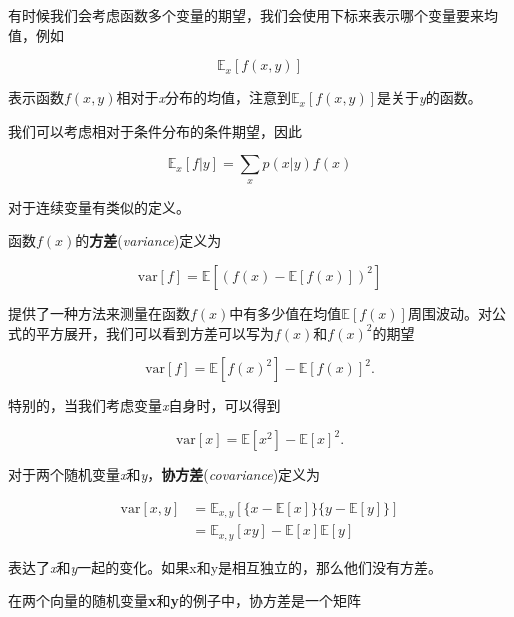 	有时候我们会考虑函数多个变量的期望，我们会使用下标来表示哪个变量要来均值，例如
	
	\begin{equation}
	\mathbb{E}_x[f(x,y)]
	\end{equation}
	
	表示函数$f(x, y)$相对于\textit{x}分布的均值，注意到$\mathbb{E}_x [f(x, y)]$是关于\textit{y}的函数。
	
	我们可以考虑相对于条件分布的条件期望，因此
	
	\begin{equation}
	\mathbb{E}_x [f|y] = \sum_x p(x|y)f(x)
	\end{equation}
	
	对于连续变量有类似的定义。
	
	函数$f(x)$的\textbf{方差}(\textit{variance})定义为
	
	\begin{equation}
	\mathrm{var}[f] = \mathbb{E} [(f(x) - \mathbb{E}[f(x)])^2]
	\end{equation}
	
	提供了一种方法来测量在函数$f(x)$中有多少值在均值$\mathbb{E}[f(x)]$周围波动。对公式的平方展开，我们可以看到方差可以写为$f(x)$和$f(x)^2$的期望
	
	\begin{equation}
	\mathrm{var}[f] = \mathbb{E} [f(x)^2] - \mathbb{E}[f(x)]^2.
	\end{equation}
	
	特别的，当我们考虑变量\textit{x}自身时，可以得到
	
	\begin{equation}
	\mathrm{var}[x] = \mathbb{E}[x^2] - \mathbb{E}[x]^2.
	\end{equation}
	
	对于两个随机变量\textit{x}和\textit{y}，\textbf{协方差}(\textit{covariance})定义为
	
	\begin{equation}
	\begin{aligned}
	\mathrm{var}[x, y] & = \mathbb{E}_{x,y}[\{x - \mathbb{E}[x]\}\{ y - \mathbb{E}[y] \}]\\
					   & = \mathbb{E}_{x,y}[xy] - \mathbb{E}[x]\mathbb{E}[y]
	\end{aligned}
	\end{equation}
	
	表达了\textit{x}和\textit{y}一起的变化。如果x和y是相互独立的，那么他们没有方差。
	
	在两个向量的随机变量\textbf{x}和\textbf{y}的例子中，协方差是一个矩阵
	
